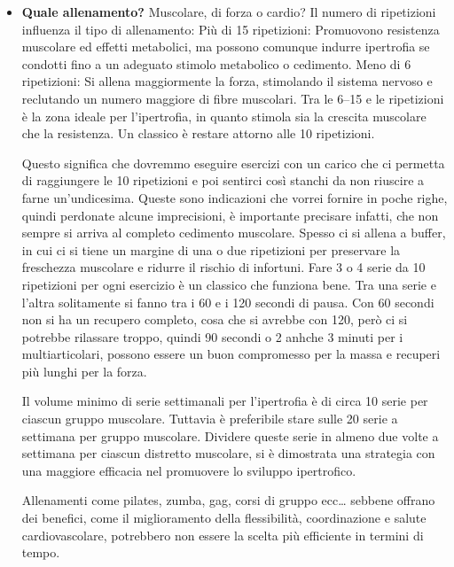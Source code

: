 \documentclass[12pt]{book} %
\begin{document}
\begin{itemize}
\item \textbf{Quale allenamento?}
Muscolare, di forza o cardio?
Il numero di ripetizioni influenza il tipo di allenamento:
Più di 15 ripetizioni: Promuovono resistenza muscolare ed effetti metabolici, ma possono comunque indurre ipertrofia se condotti fino a un adeguato stimolo metabolico o cedimento.
Meno di 6 ripetizioni: Si allena maggiormente la forza, stimolando il sistema nervoso e reclutando un numero maggiore di fibre muscolari.
Tra le 6–15 e le ripetizioni è la zona ideale per l'ipertrofia, in quanto stimola sia la crescita muscolare che la resistenza. Un classico è restare attorno alle 10 ripetizioni.

Questo significa che dovremmo eseguire esercizi con un carico che ci permetta di raggiungere le 10 ripetizioni e poi sentirci così stanchi da non riuscire a farne un'undicesima.
Queste sono indicazioni che vorrei fornire in poche righe, quindi perdonate alcune imprecisioni, è importante precisare infatti, che non sempre si arriva al completo cedimento muscolare. Spesso ci si allena a buffer, in cui ci si tiene un margine di una o due ripetizioni per preservare la freschezza muscolare e ridurre il rischio di infortuni.
Fare 3 o 4 serie da 10 ripetizioni per ogni esercizio è un classico che funziona bene. Tra una serie e l'altra solitamente si fanno tra i 60 e i 120 secondi di pausa. Con 60 secondi non si ha un recupero completo, cosa che si avrebbe con 120, però ci si potrebbe rilassare troppo, quindi 90 secondi o 2 anhche 3 minuti per i multiarticolari, possono essere un buon compromesso per la massa e recuperi più lunghi per la forza.

Il volume minimo di serie settimanali per l'ipertrofia è di circa 10 serie per ciascun gruppo muscolare. Tuttavia è preferibile stare sulle 20 serie a settimana per gruppo muscolare. Dividere queste serie in almeno due volte a settimana per ciascun distretto muscolare, si è dimostrata una strategia con una maggiore efficacia nel promuovere lo sviluppo ipertrofico.

Allenamenti come pilates, zumba, gag, corsi di gruppo ecc… sebbene offrano dei benefici, come il miglioramento della flessibilità, coordinazione e salute cardiovascolare, potrebbero non essere la scelta più efficiente in termini di tempo.


\end{itemize}
\end{document}
